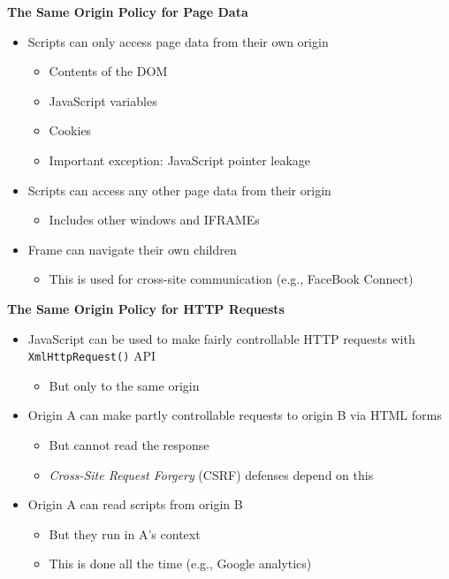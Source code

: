 \documentclass[helvetica]{seminar}
\newcommand{\heading}[1]{%
  \begin{center} 
    \large\bf 
    #1 
  \end{center} 
  \vspace{.4 in}}
\begin{document}
\begin{slide}
\heading{The Same Origin Policy for Page Data}
\begin{itemize}
\item Scripts can only access page data from their own origin
  \begin{itemize}
  \item Contents of the DOM
  \item JavaScript variables
  \item Cookies
  \item Important exception: JavaScript pointer leakage~\cite{barth-weinberger-song-cross-origin}
  \end{itemize}

\item Scripts can access any other page data from their origin
  \begin{itemize}
  \item Includes other windows and IFRAMEs
  \end{itemize}

\item Frame can navigate their own children
  \begin{itemize}
  \item This is used for cross-site communication (e.g., FaceBook Connect)
  \end{itemize}
\end{itemize}
\end{slide}



\begin{slide}
\heading{The Same Origin Policy for HTTP Requests}

\begin{itemize}
\item JavaScript can be used to make fairly controllable HTTP requests with \verb^XmlHttpRequest()^ API
  \begin{itemize}
  \item But only to the same origin 
  \end{itemize}

\item Origin A can make partly controllable requests to origin B via HTML forms
  \begin{itemize}
  \item But cannot read the response
  \item \emph{Cross-Site Request Forgery} (CSRF) defenses depend on this
  \end{itemize}

\item Origin A can read scripts from origin B
  \begin{itemize}
  \item But they run in A's context
  \item This is done all the time (e.g., Google analytics)
  \end{itemize}
\end{itemize}
\end{slide}
\end{document}
